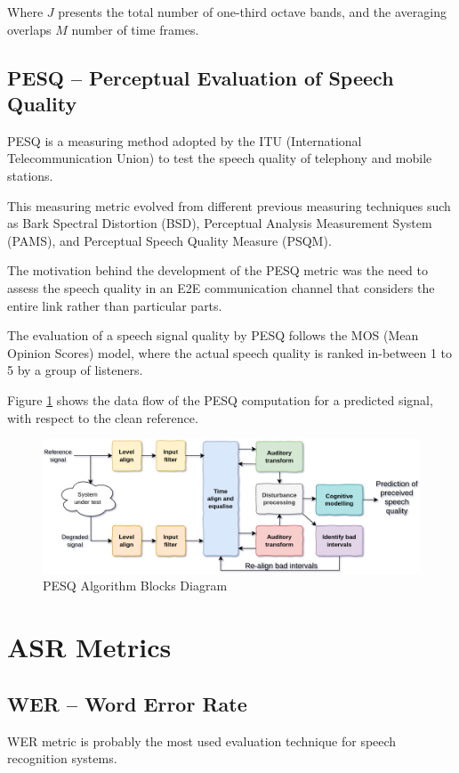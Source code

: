 Where \(J\) presents the total number of one-third octave bands,
and the averaging overlaps \(M\) number of time frames.

\subsection{PESQ -- Perceptual Evaluation of Speech Quality}
PESQ\cite{941023} is a measuring method adopted by 
the ITU (International Telecommunication Union) to
test the speech quality of telephony and mobile stations.

This measuring metric evolved from different previous 
measuring techniques such as Bark Spectral Distortion (BSD),
Perceptual Analysis Measurement System (PAMS),
and Perceptual Speech Quality Measure (PSQM).

The motivation behind the development of the PESQ metric
was the need to assess the speech quality in an E2E
communication channel that considers 
the entire link rather than particular parts.

The evaluation of a speech signal quality by PESQ
follows the MOS (Mean Opinion Scores) model, where
the actual speech quality is ranked in-between 1 to 5 
by a group of listeners.

Figure \ref{fig:pesq_blocks_diagram} shows the data flow
of the PESQ computation for a predicted signal, with respect to the
clean reference.

\begin{figure}[H]
    \centering
    \includegraphics[width=0.85\linewidth]{Features/images/pesq_blocks_diagram_new}
    \caption{PESQ Algorithm Blocks Diagram}\label{fig:pesq_blocks_diagram}
\end{figure}

\section{ASR Metrics}
\subsection{WER -- Word Error Rate}
WER\cite{KLAKOW200219} metric is probably the most used evaluation
technique for speech recognition systems.

